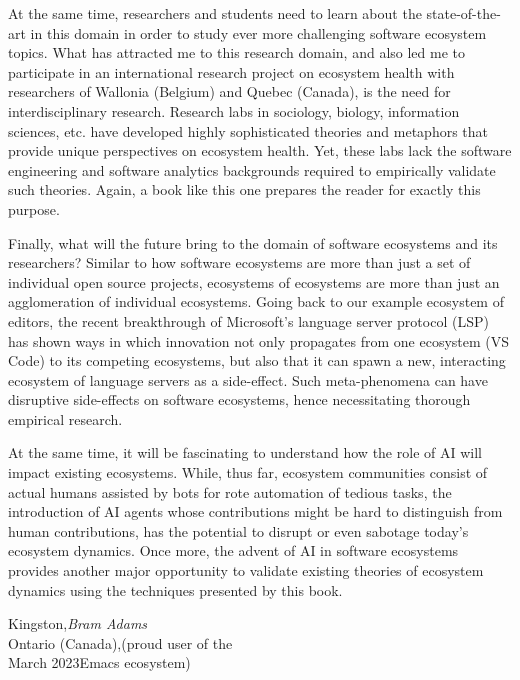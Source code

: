 At the same time, researchers and students need to learn about the state-of-the-art in this domain in order to study ever more challenging software ecosystem topics. What has attracted me to this research domain, and also led me to participate in an international research project on ecosystem health with researchers of Wallonia (Belgium) and Quebec (Canada), is the need for interdisciplinary research. Research labs in sociology, biology, information sciences, etc. have developed highly sophisticated theories and metaphors that provide unique perspectives on ecosystem health. Yet, these labs lack the software engineering and software analytics backgrounds required to empirically validate such theories. Again, a book like this one prepares the reader for exactly this purpose.

Finally, what will the future bring to the domain of software ecosystems and its researchers? Similar to how software ecosystems are more than just a set of individual open source projects, ecosystems of ecosystems are more than just an agglomeration of individual ecosystems. Going back to our example ecosystem of editors, the recent breakthrough of Microsoft's language server protocol (LSP) has shown ways in which innovation not only propagates from one ecosystem (VS Code) to its competing ecosystems, but also that it can spawn a new, interacting ecosystem of language servers as a side-effect. Such meta-phenomena can have disruptive side-effects on software ecosystems, hence necessitating thorough empirical research.

At the same time, it will be fascinating to understand how the role of AI will impact existing ecosystems. While, thus far, ecosystem communities consist of actual humans assisted by bots for rote automation of tedious tasks, the introduction of AI agents whose contributions might be hard to distinguish from human contributions, has the potential to disrupt or even sabotage today's ecosystem dynamics. Once more, the advent of AI in software ecosystems provides another major opportunity to validate existing theories of ecosystem dynamics using the techniques presented by this book.

\vspace{\baselineskip}
\begin{flushright}\noindent
  Kingston,\hfill {\it Bram  Adams}\\
  Ontario (Canada),\hfill (proud user of the \\
  March 2023\hfill Emacs ecosystem)
\end{flushright}


